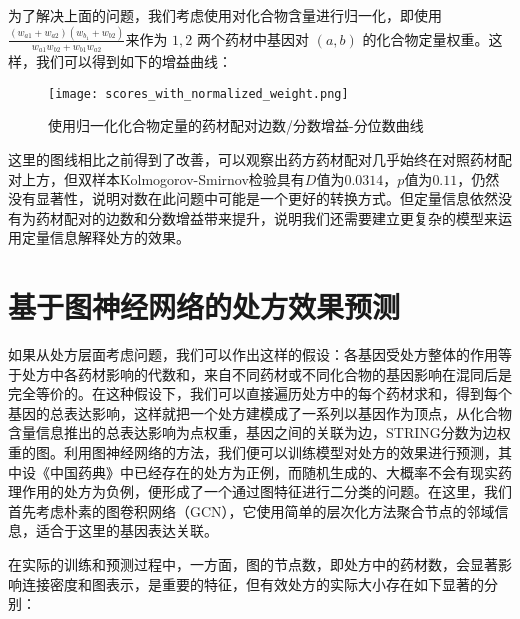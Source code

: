为了解决上面的问题，我们考虑使用对化合物含量进行归一化，即使用 $\frac{(w_{a1}+w_{a2})(w_{b_1}+w_{b2})}{w_{a1}w_{b2}+w_{b1}w_{a2}}$来作为 $1, 2$ 两个药材中基因对 $(a, b)$ 的化合物定量权重。这样，我们可以得到如下的增益曲线：

\begin{figure}[H]
  \centering
  \texttt{[image: scores\_with\_normalized\_weight.png]}
  \caption{使用归一化化合物定量的药材配对边数/分数增益-分位数曲线}
  \label{fig:scores_with_normalized_weight}
\end{figure}

这里的图线相比之前得到了改善，可以观察出药方药材配对几乎始终在对照药材配对上方，但双样本Kolmogorov-Smirnov检验具有$D$值为$0.0314$，$p$值为$0.11$，仍然没有显著性，说明对数在此问题中可能是一个更好的转换方式。但定量信息依然没有为药材配对的边数和分数增益带来提升，说明我们还需要建立更复杂的模型来运用定量信息解释处方的效果。


\section{基于图神经网络的处方效果预测}

如果从处方层面考虑问题，我们可以作出这样的假设：各基因受处方整体的作用等于处方中各药材影响的代数和，来自不同药材或不同化合物的基因影响在混同后是完全等价的。在这种假设下，我们可以直接遍历处方中的每个药材求和，得到每个基因的总表达影响，这样就把一个处方建模成了一系列以基因作为顶点，从化合物含量信息推出的总表达影响为点权重，基因之间的关联为边，STRING分数为边权重的图。利用图神经网络的方法，我们便可以训练模型对处方的效果进行预测，其中设《中国药典》中已经存在的处方为正例，而随机生成的、大概率不会有现实药理作用的处方为负例，便形成了一个通过图特征进行二分类的问题。在这里，我们首先考虑朴素的图卷积网络（GCN），它使用简单的层次化方法聚合节点的邻域信息，适合于这里的基因表达关联。

在实际的训练和预测过程中，一方面，图的节点数，即处方中的药材数，会显著影响连接密度和图表示，是重要的特征，但有效处方的实际大小存在如下显著的分别：

